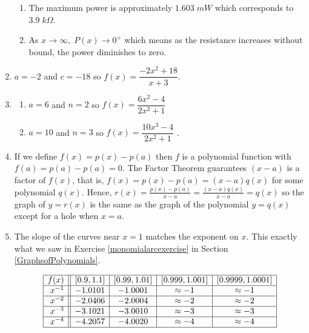 \begin{enumerate}
\begin{enumerate}
\item The maximum power is approximately $1.603 \; mW$ which corresponds to $3.9 \; k\Omega$.

\item As $x \rightarrow \infty, \; P(x) \rightarrow 0^{+}$ which means as the resistance increases without bound, the power diminishes to zero.

\end{enumerate}

\item  $a = -2$ and $c = -18$ so $f(x) = \dfrac{-2x^2+18}{x+3}$.  

\item  \begin{multicols}{2}

 \begin{enumerate}

\item   $a=6$ and $n=2$ so $f(x) = \dfrac{6x^{2} -4}{2x^2+1}$

\item  $a=10$ and $n = 3$ so $f(x) = \dfrac{10x^{3} -4}{2x^2+1}$ .

\end{enumerate}
\end{multicols}


\item  If we define $f(x) = p(x) - p(a)$ then $f$ is a polynomial function with $f(a) = p(a) - p(a) = 0$.  The Factor Theorem guarantees $(x-a)$ is a factor of $f(x)$, that is, $f(x) = p(x) - p(a) = (x-a)q(x)$ for some polynomial $q(x)$. Hence, $r(x) = \frac{p(x)-p(a)}{x-a} = \frac{(x-a)q(x)}{x-a} = q(x)$ so the graph of $y = r(x)$ is the same as the graph of the polynomial $y = q(x)$ except for a hole when $x = a$.

\item  The slope of the curves near $x=1$ matches the exponent on $x$.  This exactly what we saw in  Exercise \ref{monomialarcexercise} in Section \ref{GraphsofPolynomials}.

\[ \begin{array}{|r||c|c|c|c|}  \hline

 f(x) &  [0.9, 1.1] & [0.99, 1.01] &[0.999, 1.001] & [0.9999, 1.0001]  \\ \hline
 x^{-1} & -1.0101 & -1.0001 & \approx -1 & \approx -1  \\  \hline
 x^{-2}& -2.0406& -2.0004 & \approx -2 & \approx -2   \\  \hline
 x^{-3} &-3.1021 & -3.0010 & \approx -3 & \approx -3   \\  \hline
 x^{-4} &-4.2057 & -4.0020 &\approx -4 & \approx -4   \\   \hline


\end{array} \]

\end{enumerate}
